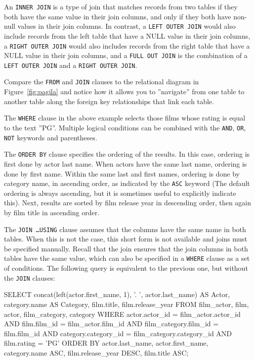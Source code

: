 \begin{withcode}
An \texttt{INNER JOIN} is a type of join that matches records from two tables if they both have the same value in their join columns, and only if they both have non-null values in their join columns. In contrast, a \texttt{LEFT OUTER JOIN} would also include records from the left table that have a NULL value in their join columns, a \texttt{RIGHT OUTER JOIN} would also includes records from the right table that have a NULL value in their join columns, and a \texttt{FULL OUT JOIN} is the combination of a \texttt{LEFT OUTER JOIN} and a \texttt{RIGHT OUTER JOIN}.

Compare the \texttt{FROM} and \texttt{JOIN} clauses to the relational diagram in Figure~\ref{fig:pagila} and notice how it allows you to ''navigate'' from one table to another table along the foreign key relationships that link each table.

The \texttt{WHERE} clause in the above example selects those films whose rating is equal to the text ''PG''. Multiple logical conditions can be combined with the \texttt{AND}, \texttt{OR}, \texttt{NOT} keywords and parentheses.

The \texttt{ORDER BY} clause specifies the ordering of the results. In this case, ordering is first done by actor last name. When actors have the same last name, ordering is done by first name. Within the same last and first names, ordering is done by category name, in ascending order, as indicated by the \texttt{ASC} keyword (The default ordering is always ascending, but it is sometimes useful to explicitly indicate this). Next, results are sorted by film release year in descending order, then again by film title in ascending order.

The \texttt{JOIN \ldots USING} clause assumes that the columns have the same name in both tables. When this is not the case, this short form is not available and joins must be specified manually. Recall that the join ensures that the join columns in both tables have the same value, which can also be specified in a \texttt{WHERE} clause as a set of conditions. The following query is equivalent to the previous one, but without the \texttt{JOIN} clauses:

\begin{sqlcode}
SELECT concat(left(actor.first_name, 1), '. ', 
           actor.last_name) AS Actor, 
       category.name AS Category, 
       film.title, 
       film.release_year
  FROM film_actor, film, actor, film_category, category
  WHERE actor.actor_id = film_actor.actor_id AND
        film.film_id = film_actor.film_id AND
        film_category.film_id = film.film_id AND
        category.category_id = film_category.category_id AND
        film.rating = 'PG'
  ORDER BY actor.last_name, 
           actor.first_name, 
           category.name ASC, 
           film.release_year DESC, 
           film.title ASC;
\end{sqlcode}


\end{withcode}
